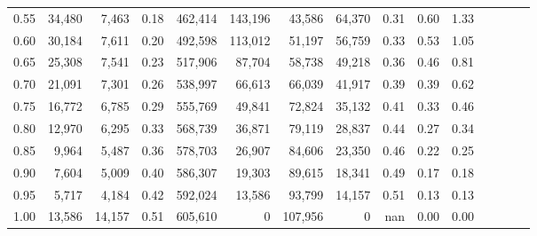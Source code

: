 \begin{tabular}{rrrcrrrrrrrrrrr}
0.55 &  34,480 &   7,463 &                                       0.18 &  462,414 &  143,196 &   43,586 &   64,370 &  0.31 &  0.60 &                         1.33 \\
0.60 &  30,184 &   7,611 &                                       0.20 &  492,598 &  113,012 &   51,197 &   56,759 &  0.33 &  0.53 &                         1.05 \\
0.65 &  25,308 &   7,541 &                                       0.23 &  517,906 &   87,704 &   58,738 &   49,218 &  0.36 &  0.46 &                         0.81 \\
0.70 &  21,091 &   7,301 &                                       0.26 &  538,997 &   66,613 &   66,039 &   41,917 &  0.39 &  0.39 &                         0.62 \\
0.75 &  16,772 &   6,785 &                                       0.29 &  555,769 &   49,841 &   72,824 &   35,132 &  0.41 &  0.33 &                         0.46 \\
0.80 &  12,970 &   6,295 &                                       0.33 &  568,739 &   36,871 &   79,119 &   28,837 &  0.44 &  0.27 &                         0.34 \\
0.85 &   9,964 &   5,487 &                                       0.36 &  578,703 &   26,907 &   84,606 &   23,350 &  0.46 &  0.22 &                         0.25 \\
0.90 &   7,604 &   5,009 &                                       0.40 &  586,307 &   19,303 &   89,615 &   18,341 &  0.49 &  0.17 &                         0.18 \\
0.95 &   5,717 &   4,184 &                                       0.42 &  592,024 &   13,586 &   93,799 &   14,157 &  0.51 &  0.13 &                         0.13 \\
1.00 &  13,586 &  14,157 &                                       0.51 &  605,610 &        0 &  107,956 &        0 &   nan &  0.00 &                         0.00 \\
\bottomrule
\end{tabular}
